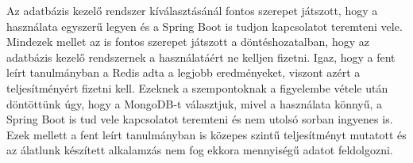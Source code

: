 
Az adatbázis kezelő rendszer kíválasztásánál fontos szerepet játszott, hogy a használata egyszerű legyen és a Spring Boot is tudjon kapcsolatot teremteni vele. Mindezek mellet az is fontos szerepet játszott a döntéshozatalban, hogy az adatbázis kezelő rendszernek a használatáért ne kelljen fizetni. Igaz, hogy a fent leírt tanulmányban a Redis adta a legjobb eredményeket, viszont azért a teljesítményért fizetni kell. Ezeknek a szempontoknak a figyelembe vétele után döntöttünk úgy, hogy a MongoDB-t választjuk, mivel a használata könnyű, a Spring Boot is tud vele kapcsolatot teremteni és nem utolsó sorban ingyenes is. Ezek mellett a fent leírt tanulmányban is közepes szintű teljesítményt mutatott és az álatlunk készített alkalamzás nem fog ekkora mennyiségű adatot feldolgozni.
